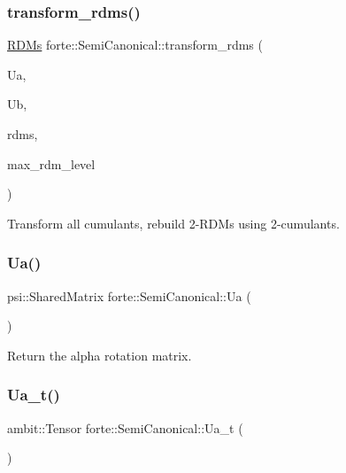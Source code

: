 \subsubsection{\texorpdfstring{transform\+\_\+rdms()}{transform\_rdms()}}
{\footnotesize\ttfamily \mbox{\hyperlink{classforte_1_1_r_d_ms}{R\+D\+Ms}} forte\+::\+Semi\+Canonical\+::transform\+\_\+rdms (\begin{DoxyParamCaption}\item[{ambit\+::\+Tensor \&}]{Ua,  }\item[{ambit\+::\+Tensor \&}]{Ub,  }\item[{\mbox{\hyperlink{classforte_1_1_r_d_ms}{R\+D\+Ms}} \&}]{rdms,  }\item[{const int \&}]{max\+\_\+rdm\+\_\+level }\end{DoxyParamCaption})}



Transform all cumulants, rebuild 2-\/\+R\+D\+Ms using 2-\/cumulants. 

\mbox{\label{classforte_1_1_semi_canonical_af9743982107774c91100d145d2084138}} 
\subsubsection{\texorpdfstring{Ua()}{Ua()}}
{\footnotesize\ttfamily psi\+::\+Shared\+Matrix forte\+::\+Semi\+Canonical\+::\+Ua (\begin{DoxyParamCaption}{ }\end{DoxyParamCaption})\hspace{0.3cm}{\ttfamily [inline]}}



Return the alpha rotation matrix. 

\mbox{\label{classforte_1_1_semi_canonical_ae526c7593f6d9ff4350c513b6bc6fcce}} 
\subsubsection{\texorpdfstring{Ua\+\_\+t()}{Ua\_t()}}
{\footnotesize\ttfamily ambit\+::\+Tensor forte\+::\+Semi\+Canonical\+::\+Ua\+\_\+t (\begin{DoxyParamCaption}{ }\end{DoxyParamCaption})\hspace{0.3cm}{\ttfamily [inline]}}



